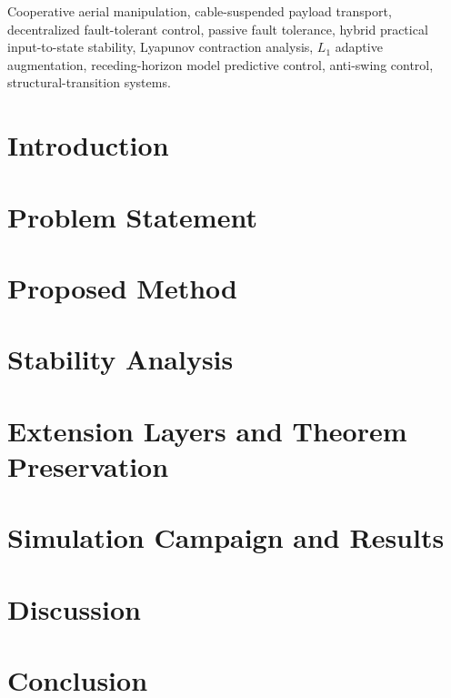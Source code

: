 \documentclass[lettersize,journal]{IEEEtran}
\begin{document}
\begin{IEEEkeywords}
Cooperative aerial manipulation, cable-suspended payload transport, decentralized fault-tolerant control, passive fault tolerance, hybrid practical input-to-state stability, Lyapunov contraction analysis, $L_1$ adaptive augmentation, receding-horizon model predictive control, anti-swing control, structural-transition systems.
\end{IEEEkeywords}


\section{Introduction}
\label{sec:Introduction}


\section{Problem Statement}
\label{sec:ProblemStatement}
\label{sec:Problem_Statement}


\section{Proposed Method}
\label{sec:ProposedMethod}
\label{sec:proposed}


\section{Stability Analysis}
\label{sec:StabilityAnalysis}
\label{sec:stability}


\section{Extension Layers and Theorem Preservation}
\label{sec:Parameter_Adaptation_Tension_Constraints_and_Post-Fault_Formation_Reshape}
\label{sec:extensions}


\section{Simulation Campaign and Results}
\label{sec:simulation}


\section{Discussion}


\section{Conclusion}




\end{document}
